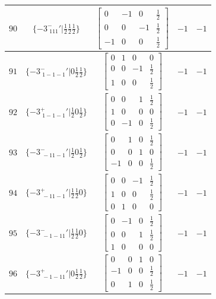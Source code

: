 \documentclass[fleqn,8pt]{jsarticle}
\begin{document}
\begin{longtable}{ccccc}
$ 90 $ & $ \{-3^{-}_{\,\,111}{}'|\frac{1}{2} \frac{1}{2} \frac{1}{2}\} $ & $ \begin{bmatrix} 0 & -1 & 0 & \frac{1}{2} \\ 0 & 0 & -1 & \frac{1}{2} \\ -1 & 0 & 0 & \frac{1}{2} \end{bmatrix} $ & $ -1 $ & $ -1 $ \\ \hline
$ 91 $ & $ \{-3^{-}_{\,\,1-1-1}{}'|0 \frac{1}{2} \frac{1}{2}\} $ & $ \begin{bmatrix} 0 & 1 & 0 & 0 \\ 0 & 0 & -1 & \frac{1}{2} \\ 1 & 0 & 0 & \frac{1}{2} \end{bmatrix} $ & $ -1 $ & $ -1 $ \\ \hline
$ 92 $ & $ \{-3^{+}_{\,\,1-1-1}{}'|\frac{1}{2} 0 \frac{1}{2}\} $ & $ \begin{bmatrix} 0 & 0 & 1 & \frac{1}{2} \\ 1 & 0 & 0 & 0 \\ 0 & -1 & 0 & \frac{1}{2} \end{bmatrix} $ & $ -1 $ & $ -1 $ \\ \hline
$ 93 $ & $ \{-3^{-}_{\,\,-11-1}{}'|\frac{1}{2} 0 \frac{1}{2}\} $ & $ \begin{bmatrix} 0 & 1 & 0 & \frac{1}{2} \\ 0 & 0 & 1 & 0 \\ -1 & 0 & 0 & \frac{1}{2} \end{bmatrix} $ & $ -1 $ & $ -1 $ \\ \hline
$ 94 $ & $ \{-3^{+}_{\,\,-11-1}{}'|\frac{1}{2} \frac{1}{2} 0\} $ & $ \begin{bmatrix} 0 & 0 & -1 & \frac{1}{2} \\ 1 & 0 & 0 & \frac{1}{2} \\ 0 & 1 & 0 & 0 \end{bmatrix} $ & $ -1 $ & $ -1 $ \\ \hline
$ 95 $ & $ \{-3^{-}_{\,\,-1-11}{}'|\frac{1}{2} \frac{1}{2} 0\} $ & $ \begin{bmatrix} 0 & -1 & 0 & \frac{1}{2} \\ 0 & 0 & 1 & \frac{1}{2} \\ 1 & 0 & 0 & 0 \end{bmatrix} $ & $ -1 $ & $ -1 $ \\ \hline
$ 96 $ & $ \{-3^{+}_{\,\,-1-11}{}'|0 \frac{1}{2} \frac{1}{2}\} $ & $ \begin{bmatrix} 0 & 0 & 1 & 0 \\ -1 & 0 & 0 & \frac{1}{2} \\ 0 & 1 & 0 & \frac{1}{2} \end{bmatrix} $ & $ -1 $ & $ -1 $ \\
\end{longtable}
\end{document}
